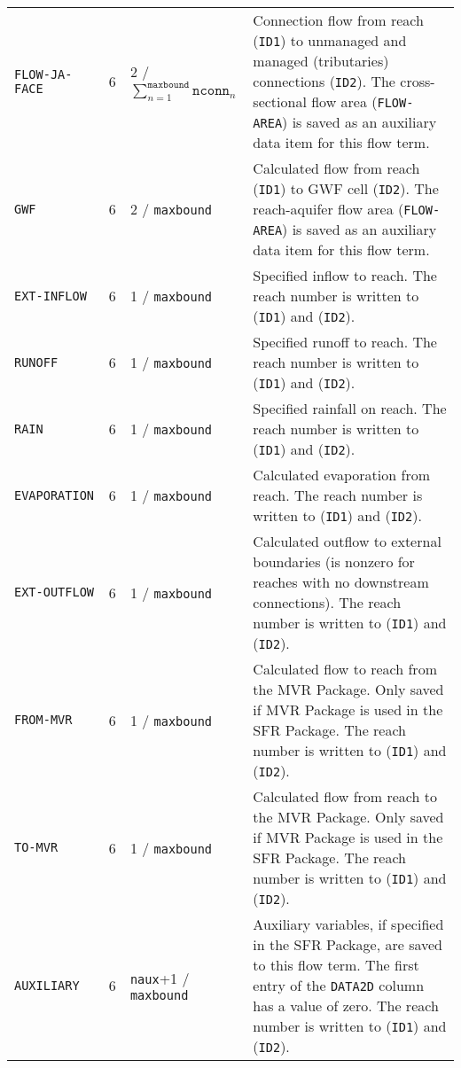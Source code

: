 \begin{longtable}{p{3.5cm} p{2cm} p{3.5cm} p{6.5cm}}
\texttt{FLOW-JA-FACE} & 6 & 2 / $\sum_{n=1}^{\texttt{maxbound}} \texttt{nconn}_n$  & Connection flow from reach (\texttt{ID1}) to unmanaged and managed (tributaries) connections (\texttt{ID2}). The cross-sectional flow area (\texttt{FLOW-AREA}) is saved as an auxiliary data item for this flow term. \\
\texttt{GWF} & 6 & 2 / \texttt{maxbound} & Calculated flow from reach (\texttt{ID1}) to GWF cell (\texttt{ID2}). The reach-aquifer flow area (\texttt{FLOW-AREA}) is saved as an auxiliary data item for this flow term.\\
\texttt{EXT-INFLOW} & 6 & 1 / \texttt{maxbound} & Specified inflow to reach. The reach number is written to (\texttt{ID1}) and (\texttt{ID2}). \\
\texttt{RUNOFF} & 6 & 1 / \texttt{maxbound} & Specified runoff to reach. The reach number is written to (\texttt{ID1}) and (\texttt{ID2}). \\
\texttt{RAIN} & 6 & 1 / \texttt{maxbound} & Specified rainfall on reach. The reach number is written to (\texttt{ID1}) and (\texttt{ID2}). \\
\texttt{EVAPORATION} & 6 & 1 / \texttt{maxbound} & Calculated evaporation from reach. The reach number is written to (\texttt{ID1}) and (\texttt{ID2}). \\
\texttt{EXT-OUTFLOW} & 6 & 1 / \texttt{maxbound} & Calculated outflow to external boundaries (is nonzero for reaches with no downstream connections). The reach number is written to (\texttt{ID1}) and (\texttt{ID2}). \\
\texttt{FROM-MVR} & 6 & 1 / \texttt{maxbound} & Calculated flow to reach from the MVR Package. Only saved if MVR Package is used in the SFR Package. The reach number is written to (\texttt{ID1}) and (\texttt{ID2}). \\
\texttt{TO-MVR} & 6 & 1 / \texttt{maxbound} & Calculated flow from reach to the MVR Package. Only saved if MVR Package is used in the SFR Package. The reach number is written to (\texttt{ID1}) and (\texttt{ID2}). \\
\texttt{AUXILIARY} & 6 & \texttt{naux}+1 / \texttt{maxbound} & Auxiliary variables, if specified in the SFR Package, are saved to this flow term. The first entry of the \texttt{DATA2D} column has a value of zero.  The reach number is written to (\texttt{ID1}) and (\texttt{ID2}). 
\label{table:binarysfr}
\end{longtable}


